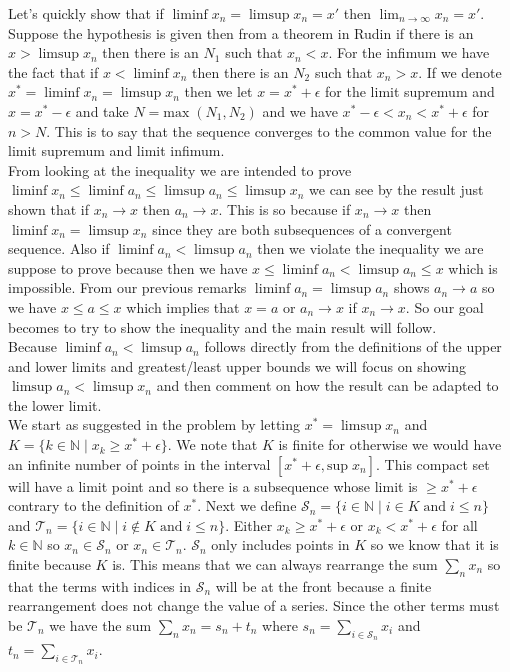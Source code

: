\documentclass[11pt,reqno]{article}
\begin{document}
Let's quickly show that if $\liminf x_n = \limsup x_n = x'$ then $\lim_{n \to \infty} x_n = x'$. Suppose the hypothesis is given then from a theorem in Rudin if there is an $x > \limsup x_n$ then there is an $N_1$ such that $x_n < x$. For the infimum we have the fact that if $x < \liminf x_n$ then there is an $N_2$ such that $x_n > x$. If we denote $x^* = \liminf x_n = \limsup x_n$ then we let $x = x^* + \epsilon$ for the limit supremum and $x = x^* - \epsilon$ and take $N = \text{max}\;(N_1,N_2)$ and we have $x^* - \epsilon < x_n < x^* + \epsilon$ for $n > N$. This is to say that the sequence converges to the common value for the limit supremum and limit infimum.\\
\indent From looking at the inequality we are intended to prove $\liminf x_n \le \liminf a_n \le \limsup a_n \le \limsup x_n$ we can see by the result just shown that if $x_n \to x$ then $a_n \to x$. This is so because if  $x_n \to x$ then $\liminf x_n = \limsup x_n$ since they are both subsequences of a convergent sequence. Also if $\liminf a_n < \limsup a_n$ then we violate the inequality we are suppose to prove because then we have $x \le \liminf a_n < \limsup a_n \le x$ which is impossible. From our previous remarks $\liminf a_n = \limsup a_n$ shows $a_n \to a$ so we have $x \le a \le x$ which implies that $x = a$ or $a_n \to x$ if $x_n \to x$. So our goal becomes to try to show the inequality and the main result will follow.\\
\indent Because $ \liminf a_n < \limsup a_n $ follows directly from the definitions of the upper and lower limits and greatest/least upper bounds we will focus on showing $\limsup a_n < \limsup x_n$ and then comment on how the result can be adapted to the lower limit.\\
\indent We start as suggested in the problem by letting $x^* = \limsup x_n$ and $K = \{ k \in \mathbb{N} \; | \; x_k \ge x^* + \epsilon \}$. We note that $K$ is finite for otherwise we would have an infinite number of points in the interval $[x^* + \epsilon, \text{sup} \; x_n]$. This compact set will have a limit point and so there is a subsequence whose limit is $\ge x^* + \epsilon$ contrary to the definition of $x^*$. Next we define $\mathcal{S}_n = \{ i \in \mathbb{N} \; | \; i \in K \; \text{and} \; i \le n\}$ and $\mathcal{T}_n = \{ i \in \mathbb{N} \; | \; i \notin K \; \text{and} \; i \le n\}$. Either $x_k \ge x^* + \epsilon$ or $x_k < x^* + \epsilon$ for all $k \in \mathbb{N}$ so $x_n \in \mathcal{S}_n$ or $x_n \in \mathcal{T}_n$. $\mathcal{S}_n$ only includes points in $K$ so we know that it is finite because $K$ is. This means that we can always rearrange the sum $\sum_n x_n$ so that the terms with indices in $\mathcal{S}_n$ will be at the front because a finite rearrangement does not change the value of a series. Since the other terms must be $\mathcal{T}_n$ we have the sum $\sum_n x_n = s_n + t_n$ where $s_n = \sum_{i \in \mathcal{S}_n}x_i$ and $t_n = \sum_{i \in \mathcal{T}_n}x_i$. \\
\end{document}
